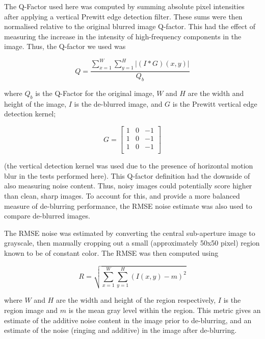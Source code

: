 The Q-Factor used here was computed by summing absolute pixel intensities after applying a vertical Prewitt edge detection filter.
These sums were then normalised relative to the original blurred image Q-factor.
This had the effect of measuring the increase in the intensity of high-frequency components in the image.
Thus, the Q-factor we used was

\begin{equation}
Q = \frac{\sum_{x=1}^{W} \sum_{y=1}^{H}
\left| (I \ast G)(x, y) \right|
\label{eq:q_factor}}{Q_b}
\end{equation}

\noindent
where $Q_b$ is the Q-Factor for the original image, $W$ and $H$ are the width and height of the image, $I$ is the de-blurred image, and $G$ is the Prewitt vertical edge detection kernel;

\begin{equation}
G = 
\begin{bmatrix}
1 & 0 & -1 \\
1 & 0 & -1 \\
1 & 0 & -1 \\
\end{bmatrix}
\label{eq:prewitt_filter}
\end{equation}

\noindent
(the vertical detection kernel was used due to the presence of horizontal motion blur in the tests performed here).
This Q-factor definition had the downside of also measuring noise content.
Thus, noisy images could potentially score higher than clean, sharp images.
To account for this, and provide a more balanced measure of de-blurring performance, the RMSE noise estimate was also used to compare de-blurred images.

The RMSE noise was estimated by converting the central sub-aperture image to grayscale, then manually cropping out a small (approximately 50x50 pixel) region known to be of constant color.
The RMSE was then computed using

\begin{equation}
R = \sqrt{ \sum_{x=1}^{W} \sum_{y=1}^{H} (I(x,y) - m)^2 }
\end{equation}

\noindent
where $W$ and $H$ are the width and height of the region respectively, $I$ is the region image and $m$ is the mean gray level within the region.
This metric gives an estimate of the additive noise content in the image prior to de-blurring, and an estimate of the noise (ringing and additive) in the image after de-blurring.

